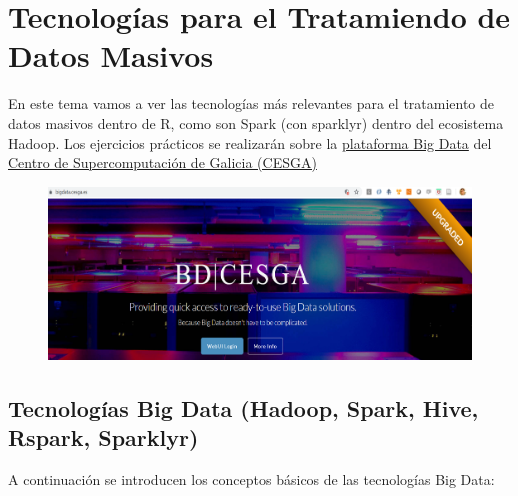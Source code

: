 \documentclass[]{book}
\begin{document}
\chapter{Tecnologías para el Tratamiendo de Datos
Masivos}\label{tecnologias-para-el-tratamiendo-de-datos-masivos}

En este tema vamos a ver las tecnologías más relevantes para el
tratamiento de datos masivos dentro de R, como son Spark (con sparklyr)
dentro del ecosistema Hadoop. Los ejercicios prácticos se realizarán
sobre la \href{http://bigdata.cesga.es/}{plataforma Big Data} del
\href{http://www.cesga.es}{Centro de Supercomputación de Galicia
(CESGA)}

\begin{figure}
\centering
\includegraphics{images/T3-bigdatacesga.png}
\caption{}
\end{figure}

\section{Tecnologías Big Data (Hadoop, Spark, Hive, Rspark,
Sparklyr)}\label{tecnologias-big-data-hadoop-spark-hive-rspark-sparklyr}

A continuación se introducen los conceptos básicos de las tecnologías
Big Data:
\end{document}
